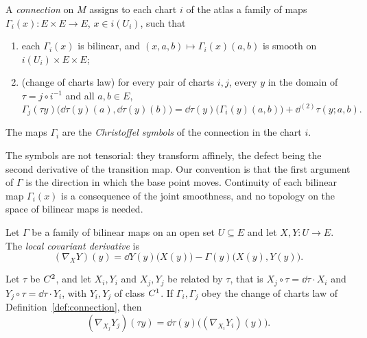 \begin{definition}[Connection]
  \label{def:connection}
  \leanok
  A \emph{connection} on $M$ assigns to each chart $i$ of the atlas a family of maps
  $\Gamma_i(x) \colon E \times E \to E$, $x \in i(U_i)$, such that
  \begin{enumerate}
    \item each $\Gamma_i(x)$ is bilinear, and $(x, a, b) \mapsto \Gamma_i(x)(a, b)$ is smooth on
    $i(U_i) \times E \times E$;
    \item (change of charts law) for every pair of charts $i, j$, every $y$ in the domain of
    $\tau = j \circ i^{-1}$ and all $a, b \in E$,
    \[
      \Gamma_j(\tau y)\bigl(\dd\tau(y)(a), \dd\tau(y)(b)\bigr)
        = \dd\tau(y)\bigl(\Gamma_i(y)(a, b)\bigr) + \dd^{(2)}\tau(y; a, b).
    \]
  \end{enumerate}
  The maps $\Gamma_i$ are the \emph{Christoffel symbols} of the connection in the chart $i$.
\end{definition}

The symbols are not tensorial: they transform affinely, the defect being the second derivative of
the transition map. Our convention is that the first argument of $\Gamma$ is the direction in
which the base point moves. Continuity of each bilinear map $\Gamma_i(x)$ is a consequence of the
joint smoothness, and no topology on the space of bilinear maps is needed.

\begin{definition}
  \label{def:conn-local-cov-deriv}
  \leanok
  Let $\Gamma$ be a family of bilinear maps on an open set $U \subseteq E$ and let
  $X, Y \colon U \to E$. The \emph{local covariant derivative} is
  \[
    (\nabla_X Y)(y) = \dd Y(y)\bigl(X(y)\bigr) - \Gamma(y)\bigl(X(y), Y(y)\bigr).
  \]
\end{definition}

\begin{lemma}
  \label{lem:conn-local-transition}
  \leanok
  Let $\tau$ be $C^{2}$, and let $X_i, Y_i$ and $X_j, Y_j$ be related by $\tau$, that is
  $X_j \circ \tau = \dd\tau \cdot X_i$ and $Y_j \circ \tau = \dd\tau \cdot Y_i$, with $Y_i, Y_j$
  of class $C^{1}$. If $\Gamma_i, \Gamma_j$ obey the change of charts law of
  Definition~\ref{def:connection}, then
  \[
    (\nabla_{X_j} Y_j)(\tau y) = \dd\tau(y)\bigl((\nabla_{X_i} Y_i)(y)\bigr).
  \]
\end{lemma}

